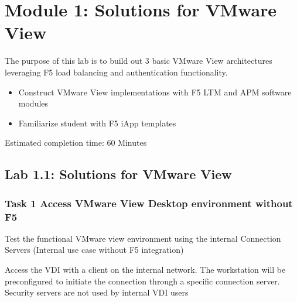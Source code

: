 \documentclass[letterpaper,10pt,english]{sphinxmanual}
\begin{document}
\section{Module 1: Solutions for VMware View}
\label{\detokenize{class2/module1/module1:module-1-solutions-for-vmware-view}}\label{\detokenize{class2/module1/module1::doc}}
The purpose of this lab is to build out 3 basic VMware View
architectures leveraging F5 load balancing and authentication
functionality.
\begin{itemize}
\item {} 
Construct VMware View implementations with F5 LTM and APM software
modules

\item {} 
Familiarize student with F5 iApp templates

\end{itemize}

Estimated completion time: 60 Minutes


\subsection{Lab 1.1: Solutions for VMware View}
\label{\detokenize{class2/module1/lab1:lab-1-1-solutions-for-vmware-view}}\label{\detokenize{class2/module1/lab1::doc}}

\subsubsection{Task 1 \textendash{} Access VMware View Desktop environment without F5}
\label{\detokenize{class2/module1/lab1:task-1-access-vmware-view-desktop-environment-without-f5}}
Test the functional VMware view environment using the internal
Connection Servers (Internal use case without F5 integration)

Access the VDI with a client on the internal network. The workstation
will be preconfigured to initiate the connection through a specific
connection server. Security servers are not used by internal VDI users

\end{document}
